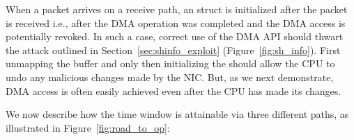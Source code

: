 When a packet arrives on a receive path, an \shinfo struct is initialized after the packet is received i.e., after the DMA operation was completed and the DMA access is potentially revoked. In such a case,
correct use of the DMA API should thwart the attack outlined in Section~\ref{sec:shinfo_exploit} (Figure~\ref{fig:sh_info}). First unmapping the buffer and only then initializing the \shinfo{} should allow the CPU to undo any malicious changes made by the NIC. But, as we next demonstrate, DMA access is often easily achieved even after the CPU has made its changes. 

We now describe how the time window is attainable via three different paths, as illustrated in Figure~\ref{fig:road_to_op}: 


